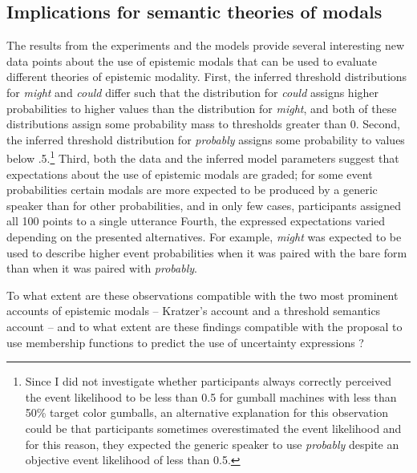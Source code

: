 \subsection{Implications for semantic theories of modals}
\label{subsec:discussion-sem-theories}

The results from the experiments and the models provide several interesting new data points about the use
of epistemic modals that can be used to evaluate different theories of epistemic modality. First, the inferred threshold 
distributions for \textit{might} and \textit{could} differ such that the distribution for \textit{could} assigns higher probabilities 
to higher values than the distribution for \textit{might}, and both of these distributions assign some probability mass to thresholds
greater than 0. Second, the inferred threshold distribution
for \textit{probably} assigns some probability to values below .5.\footnote{Since I did not investigate whether participants always correctly perceived the event likelihood to be less than 0.5 for gumball machines with less than 50\% target color gumballs, an alternative explanation for this observation could be that participants sometimes overestimated the event likelihood and for this reason, they expected the generic speaker to use \textit{probably} despite an objective event likelihood of less than 0.5.} Third, both the data
and the inferred model parameters suggest that expectations about the use of epistemic modals are graded; for some
event probabilities certain modals are more expected to be produced by a generic speaker than for other probabilities,
and in only few cases, participants assigned all 100 points to a single utterance Fourth, the expressed expectations varied 
depending on the presented alternatives. For example, \textit{might} was expected to be used to describe higher event probabilities 
when it was paired with the bare form than when it was paired with
\textit{probably}.


 To what extent are these observations compatible with the two most prominent accounts of epistemic modals -- Kratzer's \cite{Kratzer2012}
account and a threshold semantics account \cite{Lassiter2016,Swanson2006,Yalcin2010} -- and to what extent are these findings 
compatible with the proposal to use membership functions to predict the use of uncertainty expressions \cite{Wallsten1986}?

